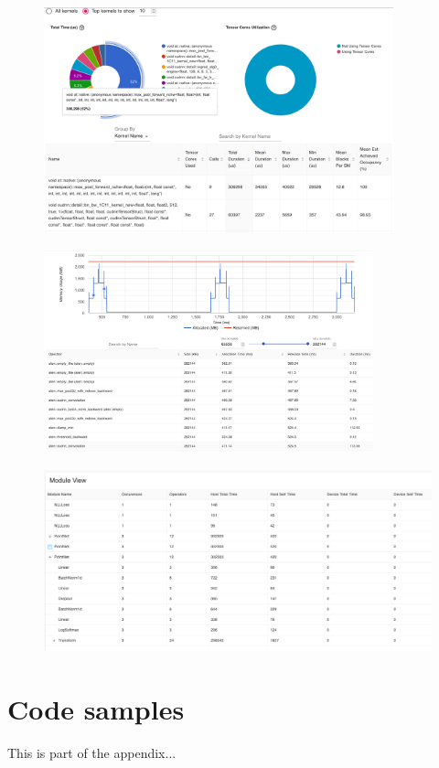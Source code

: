 \documentclass[12pt, a4paper, hidelinks]{article}
\begin{document}
\begin{figure}[H]
\centering
\includegraphics[width=0.9\textwidth]{./assets/scap_gtx1080_profiler-torch_batch-size-64_14650758_gpu-kernel-view}
\caption[GPU Kernel View]{}
\label{fig:scap_gtx1080_profiler-torch_batch-size-64_14650758_gpu-kernel-view}
\end{figure}

\begin{figure}[H]
\centering
\includegraphics[width=0.85\textwidth]{./assets/scap_gtx1080_profiler-torch_batch-size-64_14650758_memory-view}
\caption[Memory View]{}
\label{fig:scap_gtx1080_profiler-torch_batch-size-64_14650758_memory-view}
\end{figure}

\begin{figure}[H]
\centering
\includegraphics[width=1\textwidth]{./assets/scap_gtx1080_profiler-torch_batch-size-64_14650758_module-view}
\caption[Module View]{}
\label{fig:scap_gtx1080_profiler-torch_batch-size-64_14650758_module-view}
\end{figure}


\section{Code samples}

This is part of the appendix...
\end{document}
